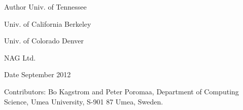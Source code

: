 \begin{DoxyAuthor}{Author}
Univ. of Tennessee 

Univ. of California Berkeley 

Univ. of Colorado Denver 

N\+A\+G Ltd. 
\end{DoxyAuthor}
\begin{DoxyDate}{Date}
September 2012 
\end{DoxyDate}
\begin{DoxyParagraph}{Contributors\+: }
Bo Kagstrom and Peter Poromaa, Department of Computing Science, Umea University, S-\/901 87 Umea, Sweden. 
\end{DoxyParagraph}
